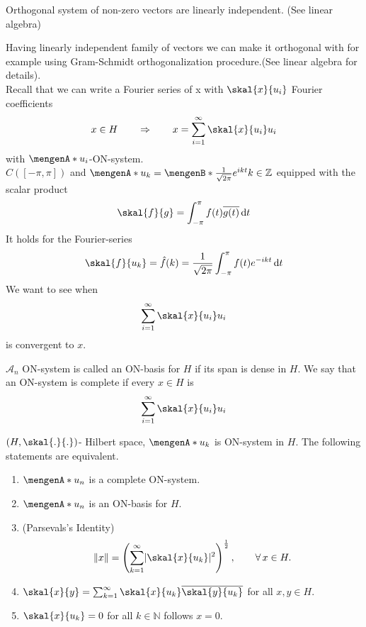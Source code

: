 	\begin{proposition}
		Orthogonal system of non-zero vectors are linearly independent. (See linear algebra)
	\end{proposition}
	Having linearly independent family of vectors we can make it orthogonal with for example using Gram-Schmidt orthogonalization procedure.(See linear algebra for details). \\
	Recall that we can write a Fourier series of x with $\skal{x}{u_i}$ Fourier coefficients
		\[
			x \in H \qquad \Rightarrow \qquad x = \sum^{\infty}_{i=1} \skal{x}{u_i}u_i
		\]
		with $\set{u_i}$-ON-system. \\
		$C([- \pi, \pi])$ and $\set{u_k} = \set[\frac{1}{\sqrt{2 \pi}} e^{ikt}]{k \in \mathbb{Z}}$ equipped with the scalar product
		\[
			\skal{f}{g} = \int_{- \pi}^{\pi}f(t)\overline{g(t)} \,\mathrm{d}t
		\]
		It holds for the Fourier-series
		\[
			\skal{f}{u_k} = \hat f(k) = \frac{1}{\sqrt{2 \pi}}\int_{- \pi }^{\pi} f(t) e^{- ikt} \,\mathrm{d}t
		\]
		We want to see when
		\[
			\sum^{\infty}_{i=1} \skal{x}{u_i}u_i
		\]
		is convergent to $x$.
		\begin{definition}
			$\mathcal{A}_n$ ON-system is called an ON-basis for $H$ if its span is dense in $H$. We say that an ON-system is complete if every $x \in H$ is 
			\[
				\sum^{\infty}_{i=1} \skal{x}{u_i}u_i
			\]
		\end{definition}
	\begin{theorem}
		$(H, \skal{.}{.})$- Hilbert space, $\set{u_k}$ is ON-system in $H$. The following statements are equivalent.
		\begin{enumerate}[(1)]
			\item $\set{u_n}$ is a complete ON-system.
			\item $\set{u_n}$ is an ON-basis for $H$.
			\item (Parsevals's Identity) 
			\[
				\norm{x} = \left( \sum_{k=1}^{\infty} \abs{\skal{x}{u_k}}^2 \right)^{\frac{1}{2}}, \qquad \forall\, x \in H.
			\]
			\item $\skal{x}{y} = \sum_{k=1}^{\infty} \skal{x}{u_k} \overline{\skal{y}{u_k}}$ for all $x,y \in H$.
			\item $\skal{x}{u_k} = 0$ for all $k \in \mathbb{N}$ follows $x = 0$.
		\end{enumerate}
	\end{theorem}
